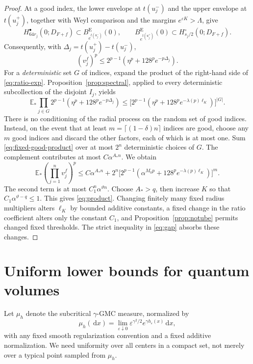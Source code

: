 \documentclass[11pt,reqno]{amsart}
\theoremstyle{plain}
\theoremstyle{definition}
\theoremstyle{remark}
\newcommand{\E}{\mathbb E}
\newcommand{\1}{\mathbf{1}}
\newcommand{\dd}{\,\mathrm d}
\newcommand{\Be}{B^{\mathrm E}}
\begin{document}
\begin{proof}
At a good index, the lower envelope at $t(u_j^-)$ and the upper envelope at $t(u_j^+)$, together with Weyl comparison and the margins $e^{\varepsilon K}>\Lambda$, give
\[
H_{64r_j}^\bullet(0;D_{F+f})\subset\Be_{e^{t(u_j^-)}}(0),\qquad
\Be_{e^{t(u_j^+)}}(0)\subset H_{s_j/2}^\circ(0;D_{F+f}).
\]
Consequently, with $\Delta_j=t(u_j^+)-t(u_j^-)$,
\begin{equation}\label{eq:ratio-exp}
(v_j^f)^p\le2^{p-1}(\eta^p+128^p e^{-p\Delta_j}).
\end{equation}
For a \emph{deterministic} set $G$ of indices, expand the product of the right-hand side of \eqref{eq:ratio-exp}. Proposition~\ref{prop:spectral}, applied to every deterministic subcollection of the disjoint $I_j$, yields
\begin{equation}\label{eq:fixed-good-product}
\E_*\prod_{j\in G}2^{p-1}(\eta^p+128^p e^{-p\Delta_j})
\le\bigl[2^{p-1}(\eta^p+128^p e^{-\lambda(p)\ell_K})\bigr]^{|G|}.
\end{equation}
There is no conditioning of the radial process on the random set of good indices. Instead, on the event that at least $m=\lceil(1-\delta)n\rceil$ indices are good, choose any $m$ good indices and discard the other factors, each of which is at most one. Sum \eqref{eq:fixed-good-product} over at most $2^n$ deterministic choices of $G$. The complement contributes at most $C\alpha^{A_*n}$. We obtain
\[
\E_*\left(\prod_{j=1}^nv_j^f\right)^p\le C\alpha^{A_*n}
+2^n\bigl[2^{p-1}(\alpha^{M_0p}+128^p e^{-\lambda(p)\ell_K})\bigr]^m.
\]
The second term is at most $C_1^n\alpha^{\vartheta n}$. Choose $A_*>q$, then increase $K$ so that $C_1\alpha^{\vartheta-q}\le1$. This gives \eqref{eq:product}. Changing finitely many fixed radius multipliers alters $\ell_K$ by bounded additive constants, a fixed change in the ratio coefficient alters only the constant $C_1$, and Proposition~\ref{prop:notube} permits changed fixed thresholds. The strict inequality in \eqref{eq:gap} absorbs these changes.
\end{proof}

\section{Uniform lower bounds for quantum volumes}\label{sec:volume}
Let $\mu_h$ denote the subcritical $\gamma$-GMC measure, normalized by
\[
\mu_h(\dd x)=\lim_{\varepsilon\downarrow0}
\varepsilon^{\gamma^2/2}e^{\gamma h_\varepsilon(x)}\dd x,
\]
with any fixed smooth regularization convention and a fixed additive normalization. We need uniformity over all centers in a compact set, not merely over a typical point sampled from $\mu_h$.
\end{document}
